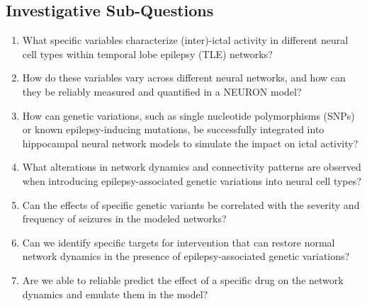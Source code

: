 \subsection*{Investigative Sub-Questions}

\begin{enumerate}
    \item What specific variables characterize (inter)-ictal activity in different neural cell types within temporal lobe epilepsy (TLE) networks?
    \item How do these variables vary across different neural networks, and how can they be reliably measured and quantified in a NEURON model?
    \item How can genetic variations, such as single nucleotide polymorphisms (SNPs) or known epilepsy-inducing mutations, be successfully integrated into hippocampal neural network models to simulate the impact on ictal activity?
    \item What alterations in network dynamics and connectivity patterns are observed when introducing epilepsy-associated genetic variations into neural cell types?
    \item Can the effects of specific genetic variants be correlated with the severity and frequency of seizures in the modeled networks?
    \item Can we identify specific targets for intervention that can restore normal network dynamics in the presence of epilepsy-associated genetic variations?
    \item Are we able to reliable predict the effect of a specific drug on the network dynamics and emulate them in the model?
\end{enumerate}